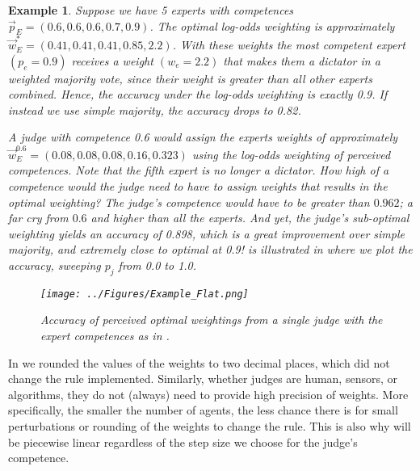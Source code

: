 \documentclass[letterpaper]{article} %
\newtheorem{example}{Example}
\newcommand{\experts}{\ensuremath{E} }
\newcommand{\expert}{\ensuremath{e} }
\begin{document}
\begin{example}\label{example:motivation}
Suppose we have 5 experts with competences $\vec{p}_\experts = (0.6, 0.6, 0.6, 0.7, 0.9)$. The optimal log-odds weighting is approximately $\vec{w}^*_\experts = (0.41, 0.41, 0.41, 0.85, 2.2)$. With these weights the most competent expert $(p_\expert = 0.9)$ receives a weight $(w_\expert = 2.2)$ that makes them a dictator in a weighted majority vote, since their weight is greater than all other experts combined. Hence, the accuracy under the log-odds weighting is exactly 0.9. If instead we use simple majority, the accuracy drops to 0.82.

A judge with competence 0.6 would assign the experts weights of approximately $\vec{w}^{0.6}_\experts = (0.08, 0.08, 0.08, 0.16, 0.323)$ using the log-odds weighting of perceived competences. Note that the fifth expert is no longer a dictator.
%
%
How high of a competence would the judge need to have to assign weights that results in the optimal weighting?
The judge's competence would have to be greater than $0.962$; a far cry from $0.6$ and higher than all the experts.
%
And yet, the judge's sub-optimal weighting yields an accuracy of 0.898, which is a great improvement over simple majority, and extremely close to optimal at 0.9!
%
 is illustrated in  where we plot the accuracy, sweeping $p_j$ from 0.0 to 1.0.

\begin{figure}[h]
 \centering
 \texttt{[image: ../Figures/Example\_Flat.png]}
 \caption{Accuracy of perceived optimal weightings from a single judge with the expert competences as in .}
 \label{fig:example}
\end{figure}
\end{example}

In  we rounded the values of the weights to two decimal places, which did not change the rule implemented. Similarly, whether judges are human, sensors, or algorithms, they do not (always) need to provide high precision of weights. More specifically, the smaller the number of agents, the less chance there is for small perturbations or rounding of the weights to change the rule. This is also why  will be piecewise linear regardless of the step size we choose for the judge's competence.
\end{document}
